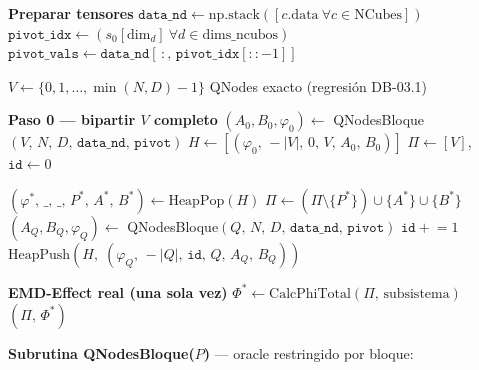 \begin{algorithm}[H]
\caption{KQNodes C4 — Refinamiento greedy submodular con MinHeap}
\label{alg:kqnodes_c4}
\begin{algorithmic}[1]

\State \textbf{Preparar tensores}
\State $\texttt{data\_nd} \leftarrow \text{np.stack}([c.\text{data}\ \forall c \in \text{NCubes}])$
\State $\texttt{pivot\_idx} \leftarrow (s_0[\text{dim}_d]\ \forall d \in \text{dims\_ncubos})$
\State $\texttt{pivot\_vals} \leftarrow \texttt{data\_nd}[\,:,\, \texttt{pivot\_idx}[::-1]]$

\State $V \leftarrow \{0, 1, \ldots, \min(N,D)-1\}$
  \State \Return QNodes exacto (regresión DB-03.1)
\EndIf

\State \textbf{Paso 0 — bipartir $V$ completo}
\State $(A_0, B_0, \varphi_0) \leftarrow$ QNodesBloque$(V,\, N,\, D,\, \texttt{data\_nd},\, \texttt{pivot})$
\State $H \leftarrow [(\varphi_0,\, -|V|,\, 0,\, V,\, A_0,\, B_0)]$
\State $\Pi \leftarrow [V]$,\quad $\texttt{id} \leftarrow 0$

  \State $(\varphi^*,\, \_,\, \_,\, P^*,\, A^*,\, B^*) \leftarrow \text{HeapPop}(H)$
  \State $\Pi \leftarrow (\Pi \setminus \{P^*\}) \cup \{A^*\} \cup \{B^*\}$
    \State $(A_Q, B_Q, \varphi_Q) \leftarrow$ QNodesBloque$(Q,\, N,\, D,\, \texttt{data\_nd},\, \texttt{pivot})$
    \State $\texttt{id} \mathrel{+}= 1$
    \State $\text{HeapPush}(H,\; (\varphi_Q,\, -|Q|,\, \texttt{id},\, Q,\, A_Q,\, B_Q))$
  \EndFor
\EndFor

\State \textbf{EMD-Effect real (una sola vez)}
\State $\Phi^* \leftarrow \text{CalcPhiTotal}(\Pi,\, \text{subsistema})$
\State \Return $(\Pi,\, \Phi^*)$
\end{algorithmic}
\end{algorithm}

\bigskip

\textbf{Subrutina QNodesBloque($P$)} — oracle restringido por bloque:

